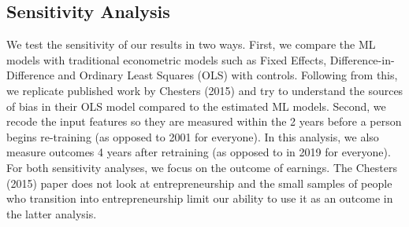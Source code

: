 \documentclass[12pt, a4paper]{article}
\begin{document}
%
%



\subsection{Sensitivity Analysis}

We test the sensitivity of our results in two ways. First, we compare the ML models with traditional econometric models such as Fixed Effects, Difference-in-Difference and Ordinary Least Squares (OLS) with controls. Following from this, we replicate published work by Chesters (2015) and try to understand the sources of bias in their OLS model compared to the estimated ML models. Second, we recode the input features so they are measured within the 2 years before a person begins re-training (as opposed to 2001 for everyone). In this analysis, we also measure outcomes 4 years after retraining (as opposed to in 2019 for everyone). For both sensitivity analyses, we focus on the outcome of earnings. The Chesters (2015) paper does not look at entrepreneurship and the small samples of people who transition into entrepreneurship limit our ability to use it as an outcome in the latter analysis.
\end{document}
